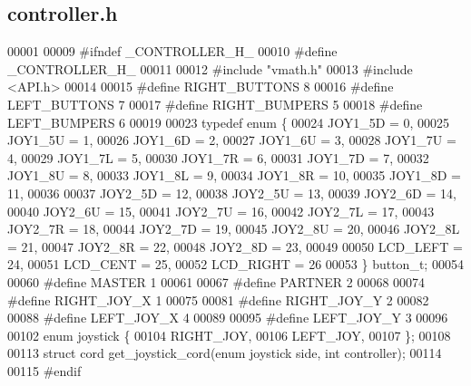 \subsection{controller.\+h}
\label{controller_8h_source}

\begin{DoxyCode}
00001 
00009 \textcolor{preprocessor}{#ifndef \_CONTROLLER\_H\_}
00010 \textcolor{preprocessor}{#define \_CONTROLLER\_H\_}
00011 
00012 \textcolor{preprocessor}{#include "vmath.h"}
00013 \textcolor{preprocessor}{#include <API.h>}
00014 
00015 \textcolor{preprocessor}{#define RIGHT\_BUTTONS 8}
00016 \textcolor{preprocessor}{#define LEFT\_BUTTONS 7}
00017 \textcolor{preprocessor}{#define RIGHT\_BUMPERS 5}
00018 \textcolor{preprocessor}{#define LEFT\_BUMPERS 6}
00019 
00023 \textcolor{keyword}{typedef} \textcolor{keyword}{enum} \{
00024   JOY1_5D = 0,
00025   JOY1_5U = 1,
00026   JOY1_6D = 2,
00027   JOY1_6U = 3,
00028   JOY1_7U = 4,
00029   JOY1_7L = 5,
00030   JOY1_7R = 6,
00031   JOY1_7D = 7,
00032   JOY1_8U = 8,
00033   JOY1_8L = 9,
00034   JOY1_8R = 10,
00035   JOY1_8D = 11,
00036 
00037   JOY2_5D = 12,
00038   JOY2_5U = 13,
00039   JOY2_6D = 14,
00040   JOY2_6U = 15,
00041   JOY2_7U = 16,
00042   JOY2_7L = 17,
00043   JOY2_7R = 18,
00044   JOY2_7D = 19,
00045   JOY2_8U = 20,
00046   JOY2_8L = 21,
00047   JOY2_8R = 22,
00048   JOY2_8D = 23,
00049 
00050   LCD_LEFT = 24,
00051   LCD_CENT = 25,
00052   LCD_RIGHT = 26
00053 \} button_t;
00054 
00060 \textcolor{preprocessor}{#define MASTER 1}
00061 
00067 \textcolor{preprocessor}{#define PARTNER 2}
00068 
00074 \textcolor{preprocessor}{#define RIGHT\_JOY\_X 1}
00075 
00081 \textcolor{preprocessor}{#define RIGHT\_JOY\_Y 2}
00082 
00088 \textcolor{preprocessor}{#define LEFT\_JOY\_X 4}
00089 
00095 \textcolor{preprocessor}{#define LEFT\_JOY\_Y 3}
00096 
00102 \textcolor{keyword}{enum} joystick \{
00104   RIGHT_JOY,
00106   LEFT_JOY,
00107 \};
00108 
00113 \textcolor{keyword}{struct }cord get_joystick_cord(enum joystick side, int controller);
00114 
00115 \textcolor{preprocessor}{#endif}
\end{DoxyCode}
